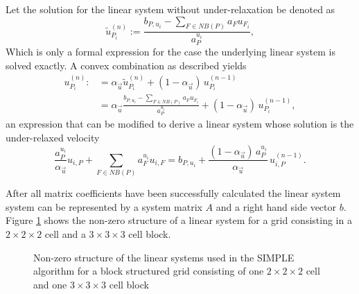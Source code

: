 Let  the solution for the linear system without under-relaxation be denoted as
\begin{displaymath}
  \tilde{u}_{P_i}^{(n)} := \frac{b_{P,u_i} - \sum_{F \in NB(P)} a_F u_{F_i}}{a_P^{u_i}},
\end{displaymath}
Which is only a formal expression for the case the underlying linear system is solved exactly. A convex combination as described yields
\begin{align*}
  u_{P_i}^{(n)} :&= \alpha_{\vec{u}} \tilde{u}_{P_i}^{(n)} + (1 - \alpha_{\vec{u}} )\, u_{P_i}^{(n-1)} \\[0.5em]
                 &= \alpha_{\vec{u}} \frac{b_{P,u_i} - \sum_{F \in NB(P)} a_F u_{F_i}}{a_P^{u_i}} + (1 - \alpha_{\vec{u}} )\, u_{P_i}^{(n-1)},
\end{align*}
an expression that can be modified to derive a linear system whose solution is the under-relaxed velocity
\begin{displaymath}
  \frac{a_P^{u_i}}{\alpha_{\vec{u}}} u_{i,P} + \sum_{F \in NB(P)} a_F^{u_i} u_{i,F} 
  = 
  b_{P,u_i} + \frac{(1 - \alpha_{\vec{u}})\, a_P^{u_i}}{\alpha_{\vec{u}}}\, u_{i,P}^{(n-1)}. 
\end{displaymath}

After all matrix coefficients have been successfully calculated the linear system system can be represented by a system matrix \(A\) and a right hand side vector \(b\). Figure \ref{fig:segassemble} shows the non-zero structure of a linear system for a grid consisting in a \(2\times2\times2\) cell and a \(3\times3\times3\) cell block.

\begin{figure}
  \centering
  \label{fig:segassemble}
  
  \caption{Non-zero structure of the linear systems used in the SIMPLE algorithm for a block structured grid consisting of one  $2\times2\times2$ cell and one $3\times3\times3$ cell block}
\end{figure}
